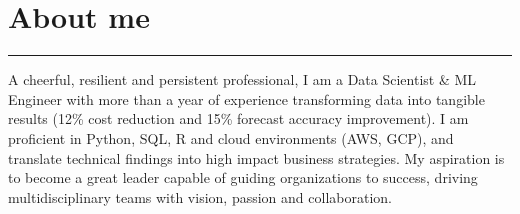 \documentclass[9pt,a4paper]{article}
\begin{document}
\section*{About me}
\vspace{-\baselineskip}
\noindent\rule{\linewidth}{0.5pt}
A cheerful, resilient and persistent professional, I am a Data Scientist \& ML Engineer with more than a year of experience transforming data into tangible results (12\% cost reduction and 15\% forecast accuracy improvement). I am proficient in Python, SQL, R and cloud environments (AWS, GCP), and translate technical findings into high impact business strategies. My aspiration is to become a great leader capable of guiding organizations to success, driving multidisciplinary teams with vision, passion and collaboration.
\end{document}
